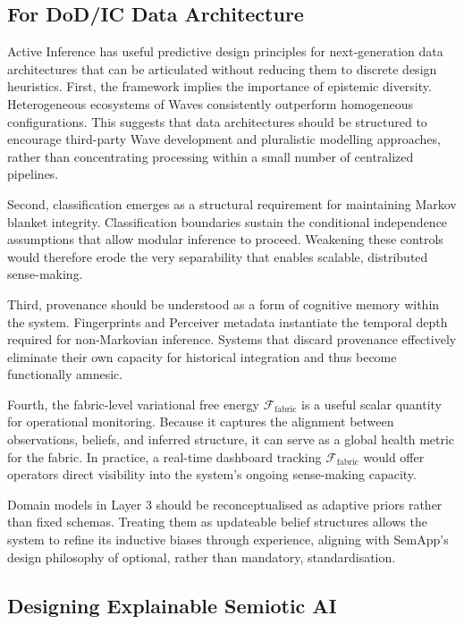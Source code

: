 \documentclass[11pt,a4paper]{article}
\theoremstyle{definition}
\begin{document}
\subsection{For DoD/IC Data Architecture}

Active Inference has useful predictive design principles for next-generation data architectures that can be articulated without reducing them to discrete design heuristics. First, the framework implies the importance of epistemic diversity. Heterogeneous ecosystems of Waves consistently outperform homogeneous configurations. This suggests that data architectures should be structured to encourage third-party Wave development and pluralistic modelling approaches, rather than concentrating processing within a small number of centralized pipelines.

Second, classification emerges as a structural requirement for maintaining Markov blanket integrity. Classification boundaries sustain the conditional independence assumptions that allow modular inference to proceed. Weakening these controls would therefore erode the very separability that enables scalable, distributed sense-making.

Third, provenance should be understood as a form of cognitive memory within the system. Fingerprints and Perceiver metadata instantiate the temporal depth required for non-Markovian inference. Systems that discard provenance effectively eliminate their own capacity for historical integration and thus become functionally amnesic.

Fourth, the fabric-level variational free energy $\mathcal{F}_{\text{fabric}}$ is a useful scalar quantity for operational monitoring. Because it captures the alignment between observations, beliefs, and inferred structure, it can serve as a global health metric for the fabric. In practice, a real-time dashboard tracking $\mathcal{F}_{\text{fabric}}$ would offer operators direct visibility into the system's ongoing sense-making capacity.

Domain models in Layer 3 should be reconceptualised as adaptive priors rather than fixed schemas. Treating them as updateable belief structures allows the system to refine its inductive biases through experience, aligning with SemApp’s design philosophy of optional, rather than mandatory, standardisation.

\subsection{Designing Explainable Semiotic AI}
\end{document}

